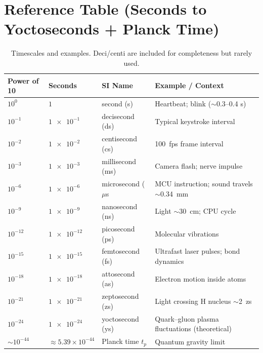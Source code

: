 \documentclass[11pt]{article}
\begin{document}
\section*{Reference Table (Seconds to Yoctoseconds + Planck Time)}
\begin{table}[h!]
  \centering
  \caption{Timescales and examples. Deci/centi are included for completeness but rarely used.}
  \setlength{\tabcolsep}{6pt}
  \begin{tabular}{@{}lll l@{}}
    \toprule
    \textbf{Power of 10} & \textbf{Seconds} & \textbf{SI Name} & \textbf{Example / Context} \\
    \midrule
    \(10^{0}\) & %
    \(\num{1}\) & %
    second (s) & %
    Heartbeat; blink (\(\sim\)0.3--0.4 s) \\ %

    \(10^{-1}\)  & %
    \(\num{1e-1}\) & %
    decisecond (ds) & %
    Typical keystroke interval \\ %

    \(10^{-2}\) & %
    \(\num{1e-2}\) & %
    centisecond (cs) & %
    100~fps frame interval \\ %

    \(10^{-3}\) & %
    \(\num{1e-3}\) & %
    millisecond (ms) & %
    Camera flash; nerve impulse \\ %

    \(10^{-6}\) & %
    \(\num{1e-6}\) & %
    microsecond (\(\mu\)s& %
    MCU instruction; sound travels \(\sim\)\SI{0.34}{mm} \\ %

    \(10^{-9}\)  & %
    \(\num{1e-9}\) & %
    nanosecond (ns) & %
    Light \(\sim\)\SI{30}{cm}; CPU cycle \\

    \(10^{-12}\) & %
    \(\num{1e-12}\) & %
    picosecond (ps) & %
    Molecular vibrations \\

    \(10^{-15}\) & %
    \(\num{1e-15}\) & %
    femtosecond (fs) & %
    Ultrafast laser pulses; bond dynamics \\

    \(10^{-18}\) & %
    \(\num{1e-18}\) & %
    attosecond (as) & %
    Electron motion inside atoms \\

    \(10^{-21}\) & %
    \(\num{1e-21}\) & %
    zeptosecond (zs) & %
    Light crossing H nucleus \(\sim\)2~zs \\

    \(10^{-24}\) & %
    \(\num{1e-24}\) & %
    yoctosecond (ys) & %
    Quark--gluon plasma fluctuations (theoretical) \\

    \addlinespace%

    \(\sim 10^{-44}\) & %
    \(\approx 5.39\times10^{-44}\) & %
    Planck time \(t_p\) & %
    Quantum gravity limit \\

    \bottomrule
  \end{tabular}
\end{table}
\end{document}
